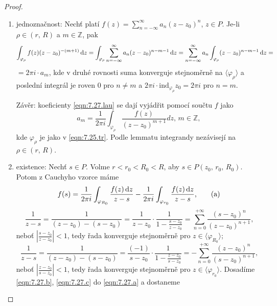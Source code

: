 \begin{proof}

\begin{enumerate}
 \item jednoznačnost: Nechť platí $f(z)=\sum\limits_{n=-\infty}^\infty a_n(z-z_0)^n$, $z \in P$. Je-li $\rho \in (r,\,R)$ a $m \in \mathbb{Z}$, pak 
$$
\int_{\varphi_\rho}f(z)(z-z_0)^{-(m+1)} \mathop{}\!\mathrm{d} z = \int_{\varphi_\rho} \sum\limits_{n=-\infty}^{\infty} a_n(z-z_0)^{n-m-1} \mathop{}\!\mathrm{d} z = \sum\limits_{n=-\infty}^{\infty} a_n \int_{\varphi_\rho}(z-z_0)^{n-m-1} \mathop{}\!\mathrm{d} z = 
$$
$=2\pi i \cdot a_m$, kde v druhé rovnosti suma konverguje stejnoměrně na $\langle\varphi_\rho \rangle$ a poslední integrál je roven $0$ pro $n \neq m$ a $2\pi i \cdot \text{ind}_{\varphi_\rho}z_0=2\pi i$ pro $n=m$.

Závěr: koeficienty \cref{eqn:7.27.lau} se dají vyjádřit pomocí součtu $f$ jako 
\begin{equation}
    a_m=\frac{1}{2 \pi i}\int_{\varphi_\rho}\frac{f(z)}{(z-z_0)^{m+1}} dz\text{, } m \in \mathbb{Z}, 
    \tag{**}
    \label{eqn:7.27.**}
\end{equation}
kde $\varphi_\rho$ je jako v \cref{eqn:7.25.tr}. Podle lemmatu integrandy nezávisejí na $\rho \in (r,\,R)$.
\item existence: Nechť $s \in P$. Volme $r<r_0<R_0<R$, aby $s \in P(z_0,\,r_0,\,R_0)$. Potom z Cauchyho vzorce máme \begin{equation}
    f(s)=\frac{1}{2 \pi i}\int_{\varphi_{R_0}}\frac{f(z) \mathop{}\!\mathrm{d} z}{z-s}-\frac{1}{2 \pi i}\int_{\varphi_{r_0}}\frac{f(z) \mathop{}\!\mathrm{d} z}{z-s}\text{,}
    \tag{a}
    \label{eqn:7.27.a}
\end{equation}
\begin{equation}
    \frac{1}{z-s}=\frac{1}{(z-z_0)-(s-z_0)}=\frac{1}{z-z_0}\cdot \frac{1}{1-\frac{s-z_0}{z-z_0}}=\sum\limits_{n=0}^{+\infty}\frac{(s-z_0)^n}{(z-z_0)^{n+1}}\text{,}
    \tag{b}
    \label{eqn:7.27.b}
\end{equation}
neboť $\left|\frac{s-z_0}{z-z_0}\right|<1$, tedy řada konverguje stejnoměrně pro $z \in \langle\varphi_{R_0} \rangle$;
\begin{equation}
    \frac{1}{z-s}=\frac{1}{(z-z_0)-(s-z_0)}=\frac{(-1)}{s-z_0}\cdot \frac{1}{1-\frac{z-z_0}{s-z_0}}=-\sum\limits_{n=0}^{+\infty}\frac{(z-z_0)^n}{(s-z_0)^{n+1}}\text{,}
    \tag{c}
    \label{eqn:7.27.c}   
\end{equation}
neboť $\left|\frac{z-z_0}{s-z_0}\right|<1$, tedy řada konverguje stejnoměrně pro $z \in \langle\varphi_{r_0} \rangle$.
Dosadíme \cref{eqn:7.27.b}, \cref{eqn:7.27.c} do \cref{eqn:7.27.a} a dostaneme

\end{enumerate}
\end{proof}
